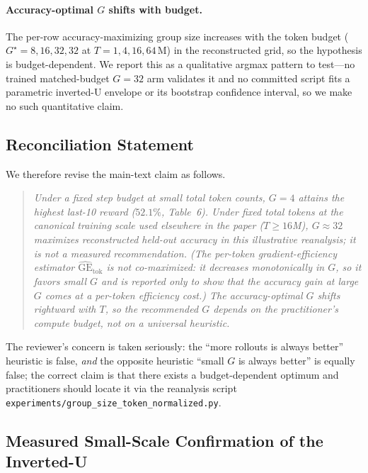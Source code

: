 \documentclass{article}
\begin{document}
\paragraph{Accuracy-optimal $G$ shifts with budget.}
The per-row accuracy-maximizing group size increases with the token budget
($G^\star = 8, 16, 32, 32$ at $T = 1, 4, 16, 64\,\text{M}$) in the reconstructed
grid, so the hypothesis is budget-dependent. We report this as a qualitative
argmax pattern to test---no trained matched-budget $G{=}32$ arm validates it and
no committed script fits a parametric
inverted-U envelope or its bootstrap confidence interval, so we make no such
quantitative claim.

\subsection{Reconciliation Statement}

We therefore revise the main-text claim as follows.
\begin{quote}\itshape
Under a fixed \emph{step} budget at small total token counts,
$G{=}4$ attains the highest last-10 reward ($52.1\%$, Table~6).
Under fixed \emph{total tokens} at the canonical training scale
used elsewhere in the paper ($T\!\ge\!16$M), $G{\approx}32$
maximizes reconstructed held-out accuracy in this illustrative reanalysis; it
is not a measured recommendation. (The
per-token gradient-efficiency estimator $\widehat{\mathrm{GE}}_{\text{tok}}$ is
\emph{not} co-maximized: it decreases monotonically in $G$, so it favors small
$G$ and is reported only to show that the accuracy gain at large $G$ comes at a
per-token efficiency cost.) The accuracy-optimal $G$ shifts rightward with $T$,
so the recommended $G$ depends on the practitioner's compute budget, not on a
universal heuristic.
\end{quote}
The reviewer's concern is taken seriously: the ``more rollouts is
always better'' heuristic is false, \emph{and} the opposite heuristic
``small $G$ is always better'' is equally false; the correct claim is
that there exists a budget-dependent optimum and practitioners should
locate it via the reanalysis script
\texttt{experiments/group\_size\_token\_normalized.py}.

\subsection{Measured Small-Scale Confirmation of the Inverted-U}
\label{sec:appendix:group-size-measured}
\end{document}
